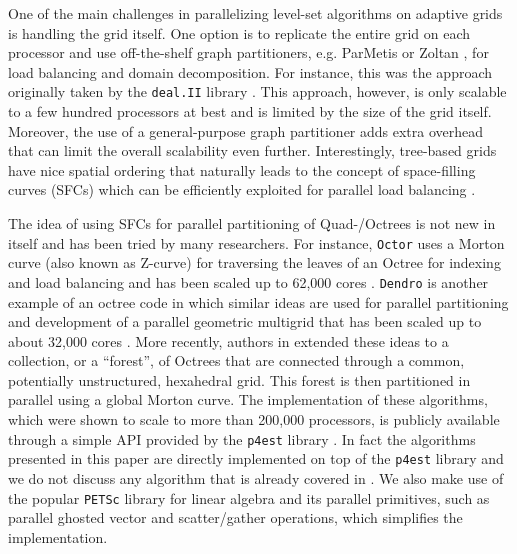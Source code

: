 One of the main challenges in parallelizing level-set algorithms on adaptive grids is handling the grid itself. One option is to replicate the entire grid on each processor and use off-the-shelf graph partitioners, e.g. ParMetis \cite{Karypis;Kumar:98:A-parallel-algorithm} or Zoltan \cite{Boman;Catalyurek;Chevalier;etal:12:The-Zoltan-and-Isorr}, for load balancing and domain decomposition. For instance, this was the approach originally taken by the \texttt{deal.II} library \cite{Bangerth;Hartmann;Kanschat:07:deal.II----a-General}. This approach, however, is only scalable to a few hundred processors at best and is limited by the size of the grid itself. Moreover, the use of a general-purpose graph partitioner adds extra overhead that can limit the overall scalability even further. Interestingly, tree-based grids have nice spatial ordering that naturally leads to the concept of space-filling curves (SFCs) which can be efficiently exploited for parallel load balancing \cite{Aluru;Sevilgen:97:Parallel-domain-deco,Campbell;Devine;Flaherty;etal:03:Dynamic-octree-load-}.

The idea of using SFCs for parallel partitioning of Quad-/Octrees is not new in itself and has been tried by many researchers. For instance, \texttt{Octor} \cite{Tu;OHallaron;Ghattas:05:Scalable-parallel-oc} uses a Morton curve (also known as Z-curve) for traversing the leaves of an Octree for indexing and load balancing and has been scaled up to 62,000 cores \cite{Burstedde;Ghattas;Gurnis;etal:08:Scalable-adaptive-ma}. \texttt{Dendro} \cite{Sampath;Adavani;Sundar;etal:08:Dendro:-parallel-alg} is another example of an octree code in which similar ideas are used for parallel partitioning and development of a parallel geometric multigrid that has been scaled up to about 32,000 cores \cite{Sampath;Biros:10:A-parallel-geometric}. More recently, authors in \cite{Burstedde;Wilcox;Ghattas:11:p4est:-Scalable-Algo} extended these ideas to a collection, or a ``forest'', of Octrees that are connected through a common, potentially unstructured, hexahedral grid. This forest is then partitioned in parallel using a global Morton curve. The implementation of these algorithms, which were shown to scale to more than 200,000 processors, is publicly available through a simple API provided by the \texttt{p4est} library \cite{p4est-github}. In fact the algorithms presented in this paper are directly implemented on top of the \texttt{p4est} library and we do not discuss any algorithm that is already covered in \cite{Burstedde;Wilcox;Ghattas:11:p4est:-Scalable-Algo}. We also make use of the popular \texttt{PETSc} \cite{Balay;Abhyankar;Adams;etal:14:PETSc-Web-page} library for linear algebra and its parallel primitives, such as parallel ghosted vector and scatter/gather operations, which simplifies the implementation. 

